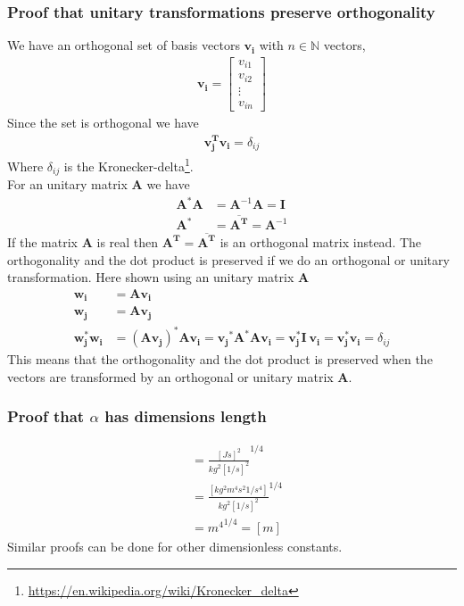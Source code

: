 \documentclass[american,a4paper,12pt]{article}
\renewcommand{\vec}[1]{\mathbf{#1}} %
\begin{document}
\subsubsection*{Proof that unitary transformations preserve orthogonality}
We have an orthogonal set of basis vectors $\vec{v_i}$ with $n \in \mathbb{N}$ vectors,
\begin{align*}
    \vec{v_i} = \begin{bmatrix}
    v_{i1} \\ v_{i2} \\ \vdots \\ v_{in}
    \end{bmatrix}
\end{align*}
Since the set is orthogonal we have
\begin{align*}
    \vec{v_j^T} \vec{v_i} = \delta_{ij}
\end{align*}
Where $\delta_{ij}$ is the Kronecker-delta\footnote{\url{https://en.wikipedia.org/wiki/Kronecker_delta}}.\\
For an unitary matrix $\vec{A}$ we have
\begin{align*}
    \vec{A}^* \vec{A} &= \vec{A}^{-1} \vec{A} = \vec{I}\\
    \vec{A}^* &= \overline{\vec{A^T}} = \vec{A}^{-1}
\end{align*}
If the matrix $\vec{A}$ is real then $\vec{A^T} =  \overline{\vec{A^T}}$ is an orthogonal matrix instead.
The orthogonality and the dot product is preserved if we do an orthogonal or unitary transformation. Here shown using an unitary matrix $\vec{A}$
\begin{align*}
    \vec{w_i} &= \vec{A} \vec{v_i}\\
    \vec{w_j} &= \vec{A} \vec{v_j}\\
    \vec{w_j^*} \vec{w_i} &= (\vec{A} \vec{v_j})^* \vec{A} \vec{v_i} = \vec{v_j}^* \vec{A}^* \vec{A} \vec{v_i} = \vec{v_j^*} \vec{I}\ \vec{v_i} =\vec{v_j^*} \vec{v_i} = \delta_{ij}
\end{align*}
This means that the orthogonality and the dot product is preserved when the vectors are transformed by an orthogonal or unitary matrix $\vec{A}$.

\subsubsection*{Proof that $\alpha$ has dimensions length}
\begin{align*}
    [m] &= \frac{[Js]^2}{kg^2 [1/s]^2}^{1/4}\\
    &= \frac{[kg^2 m^4 s^2 1/s^4 ]}{kg^2 [1/s]^2}^{1/4}\\
    &= {m^4}^{1/4} = [m]
\end{align*}
Similar proofs can be done for other dimensionless constants.
\end{document}
